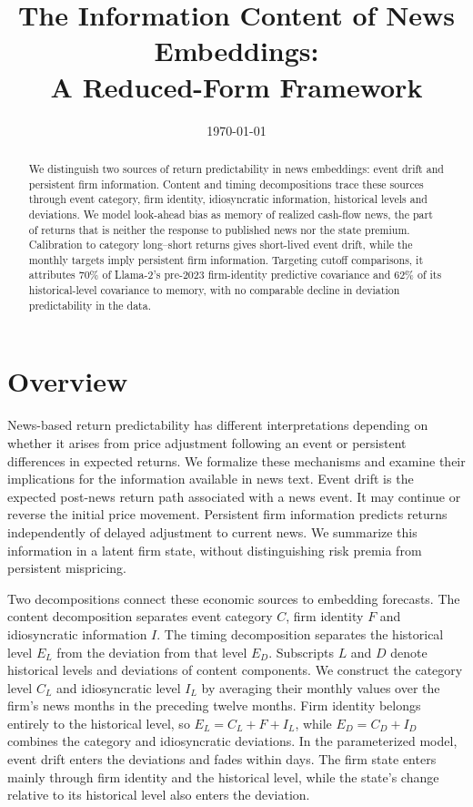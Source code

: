 \documentclass[11pt,letterpaper]{article}
\title{The Information Content of News Embeddings:\\ A Reduced-Form Framework}
\date{\today}
\author{}
\theoremstyle{remark}
\begin{document}
\maketitle
\begin{abstract}
We distinguish two sources of return predictability in news embeddings: event drift and persistent firm information. Content and timing decompositions trace these sources through event category, firm identity, idiosyncratic information, historical levels and deviations. We model look-ahead bias as memory of realized cash-flow news, the part of returns that is neither the response to published news nor the state premium. Calibration to category long--short returns gives short-lived event drift, while the monthly targets imply persistent firm information. Targeting cutoff comparisons, it attributes 70\% of Llama-2's pre-2023 firm-identity predictive covariance and 62\% of its historical-level covariance to memory, with no comparable decline in deviation predictability in the data.
\end{abstract}

\section{Overview}\label{sec:overview}

News-based return predictability has different interpretations depending on whether it arises from price adjustment following an event or persistent differences in expected returns. We formalize these mechanisms and examine their implications for the information available in news text. Event drift is the expected post-news return path associated with a news event. It may continue or reverse the initial price movement. Persistent firm information predicts returns independently of delayed adjustment to current news. We summarize this information in a latent firm state, without distinguishing risk premia from persistent mispricing.

Two decompositions connect these economic sources to embedding forecasts. The content decomposition separates event category $C$, firm identity $F$ and idiosyncratic information $I$. The timing decomposition separates the historical level $E_L$ from the deviation from that level $E_D$. Subscripts $L$ and $D$ denote historical levels and deviations of content components. We construct the category level $C_L$ and idiosyncratic level $I_L$ by averaging their monthly values over the firm's news months in the preceding twelve months. Firm identity belongs entirely to the historical level, so $E_L=C_L+F+I_L$, while $E_D=C_D+I_D$ combines the category and idiosyncratic deviations. In the parameterized model, event drift enters the deviations and fades within days. The firm state enters mainly through firm identity and the historical level, while the state's change relative to its historical level also enters the deviation.
\end{document}
